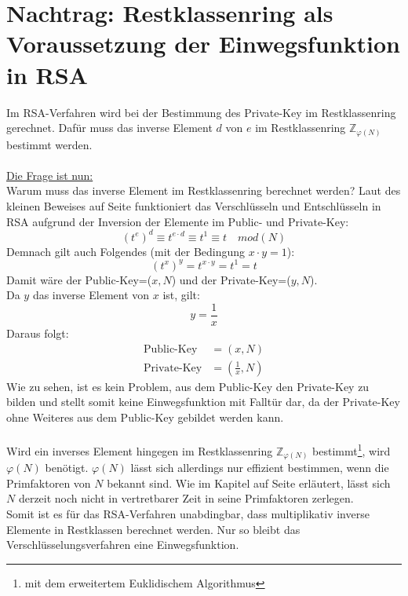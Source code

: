 \section{Nachtrag: Restklassenring als Voraussetzung der Einwegsfunktion in RSA}
\label{sec:Nachtrag}
Im RSA-Verfahren wird bei der Bestimmung des Private-Key im Restklassenring gerechnet. Dafür muss das inverse Element $d$ von $e$ im Restklassenring $\mathbb{Z}_{\varphi(N)}$ bestimmt werden.\\
\\
\underline{Die Frage ist nun:}\\
Warum muss das inverse Element im Restklassenring berechnet werden?
Laut des kleinen Beweises auf Seite \pageref{sec:Beweis} funktioniert das Verschlüsseln und Entschlüsseln in RSA aufgrund der Inversion der Elemente im Public- und Private-Key:
\begin{equation*}
(t^{e})^{d} \equiv t^{e\cdot d} \equiv t^{1} \equiv t \quad mod(N)
\end{equation*}
Demnach gilt auch Folgendes (mit der Bedingung $x\cdot y=1$):
\begin{equation*}
(t^{x})^{y} = t^{x\cdot y} = t^{1} = t
\end{equation*}
Damit wäre der Public-Key=($x,N$) und der Private-Key=($y,N$).\\
Da $y$ das inverse Element von $x$ ist, gilt:
\begin{equation*}
y=\frac{1}{x}
\end{equation*}
Daraus folgt:
\begin{align*}
\text{Public-Key} &=(x,N)\\
\text{Private-Key} &=(\frac{1}{x},N)
\end{align*}
Wie zu sehen, ist es kein Problem, aus dem Public-Key den Private-Key zu bilden und stellt somit keine Einwegsfunktion mit Falltür dar, da der Private-Key ohne Weiteres aus dem Public-Key gebildet werden kann.\\
\\
Wird ein inverses Element hingegen im Restklassenring $\mathbb{Z}_{\varphi(N)}$ bestimmt\footnote{mit dem erweitertem Euklidischem Algorithmus}, wird $\varphi{(N)}$ benötigt.
$\varphi(N)$ lässt sich allerdings nur effizient bestimmen, wenn die Primfaktoren von $N$ bekannt sind. Wie im Kapitel  auf Seite \pageref{sec:Faktorisierungsproblem} erläutert, lässt sich $N$ derzeit noch nicht in vertretbarer Zeit in seine Primfaktoren zerlegen.\\
Somit ist es für das RSA-Verfahren unabdingbar, dass multiplikativ inverse Elemente in Restklassen berechnet werden. Nur so bleibt das Verschlüsselungsverfahren eine Einwegsfunktion.